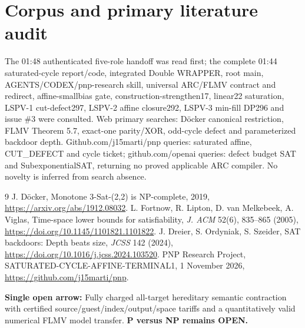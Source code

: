 \documentclass[11pt]{article}
\begin{document}
\section{Corpus and primary literature audit}
The 01:48 authenticated five-role handoff was read first; the complete 01:44 saturated-cycle report/code, integrated Double WRAPPER, root main, AGENTS/CODEX/pnp-research skill, universal ARC/FLMV contract and redirect, affine-smallbias gate, construction-strengthen17, linear22 saturation, LSPV-1 cut-defect297, LSPV-2 affine closure292, LSPV-3 min-fill DP296 and issue \#3 were consulted. Web primary searches: D\"ocker canonical restriction, FLMV Theorem 5.7, exact-one parity/XOR, odd-cycle defect and parameterized backdoor depth. Github.com/j15marti/pnp queries: saturated affine, CUT\_DEFECT and cycle ticket; github.com/openai queries: defect budget SAT and SubexponentialSAT, returning no proved applicable ARC compiler. No novelty is inferred from search absence.
\begin{thebibliography}{9}
 J. D\"ocker, Monotone 3-Sat-(2,2) is NP-complete, 2019, \url{https://arxiv.org/abs/1912.08032}.
 L. Fortnow, R. Lipton, D. van Melkebeek, A. Viglas, Time-space lower bounds for satisfiability, \emph{J. ACM} 52(6), 835--865 (2005), \url{https://doi.org/10.1145/1101821.1101822}.
 J. Dreier, S. Ordyniak, S. Szeider, SAT backdoors: Depth beats size, \emph{JCSS} 142 (2024), \url{https://doi.org/10.1016/j.jcss.2024.103520}.
 PNP Research Project, SATURATED-CYCLE-AFFINE-TERMINAL1, 1 November 2026, \url{https://github.com/j15marti/pnp}.
\end{thebibliography}
\noindent\textbf{Single open arrow:} Fully charged all-target hereditary semantic contraction with certified source/guest/index/output/space tariffs and a quantitatively valid numerical FLMV model transfer. \textbf{P versus NP remains OPEN.}
\end{document}
